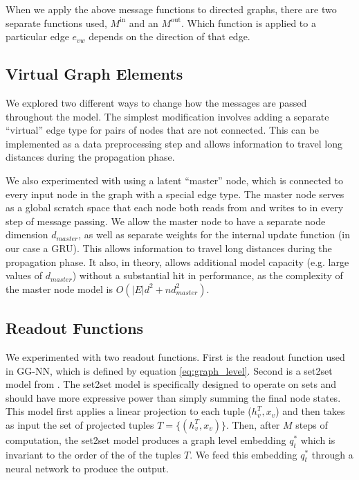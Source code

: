 \documentclass{article}
\begin{document}
When we apply the above message functions to directed graphs, there are two separate functions used, $M^{\textrm{in}}$ and an $M^{\textrm{out}}$. Which function is applied to a particular edge $e_{vw}$ depends on the direction of that edge.

\subsection{Virtual Graph Elements}
	We explored two different ways to change how the messages are passed throughout the model. The simplest modification involves adding a separate ``virtual'' edge type for pairs of nodes that are not connected. This can be implemented as a data preprocessing step and allows information to travel long distances during the propagation phase. 
	
  We also experimented with using a latent ``master'' node, which is connected to every input node in the graph with a special edge type. The master node serves as a global scratch space that each node both reads from and writes to in every step of message passing. We allow the master node to have a separate node dimension $d_{master}$, as well as separate weights for the internal update function (in our case a GRU). This allows information to travel long distances during the propagation phase. It also, in theory, allows additional model capacity (e.g. large values of $d_{master}$) without a substantial hit in performance, as the complexity of the master node model is $O(|E| d^2 + n d^2_{master})$. 

\subsection{Readout Functions}
   We experimented with two readout functions. First is the readout function used in GG-NN, which is defined by equation \ref{eq:graph_level}. Second is a set2set model from \citet{vinyals}. The set2set model is specifically designed to operate on sets and should have more expressive power than simply summing the final node states. This model first applies a linear projection to each tuple ($h_v^{T}, x_v$) and then takes as input the set of projected tuples $T = \{ (h_v^{T}, x_v)\}$. Then, after $M$ steps of computation, the set2set model produces a graph level embedding $q_t^*$ which is invariant to the order of the of the tuples $T$. We feed this embedding $q_t^*$ through a neural network to produce the output. 
\end{document}
